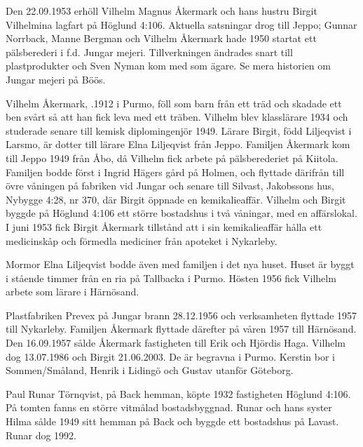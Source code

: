 Den 22.09.1953 erhöll Vilhelm Magnus Åkermark och hans hustru	Birgit Vilhelmina lagfart på Höglund 4:106. Aktuella satsningar drog till Jeppo; Gunnar Norrback, Manne Bergman och Vilhelm Åkermark hade 1950 startat ett pälsberederi i f.d. Jungar mejeri. Tillverkningen ändrades snart till plastprodukter och Sven Nyman kom med som ägare. Se mera historien om Jungar mejeri på Böös.

Vilhelm Åkermark, .1912 i Purmo, föll som barn från ett träd och skadade ett ben svårt så att han fick leva med ett träben. Vilhelm blev klasslärare 1934 och studerade senare till kemisk diplomingenjör 1949. 	Lärare Birgit, född Liljeqvist i Larsmo, är dotter till lärare Elna Liljeqvist från Jeppo. Familjen Åkermark kom till Jeppo 1949 från Åbo, då Vilhelm	fick arbete på pälsberederiet på Kiitola. Familjen bodde först i Ingrid Hägers gård på Holmen, och flyttade därifrån till övre våningen på fabriken vid Jungar och senare till Silvast, Jakobssons hus, Nybygge 4:28, nr 370, där Birgit öppnade en kemikalieaffär. Vilhelm och Birgit byggde på Höglund 4:106 ett större bostadshus i två våningar, med en 	affärslokal. I juni 1953 fick Birgit Åkermark tillstånd att i sin kemikalieaffär hålla ett medicinskåp och förmedla mediciner från apoteket i Nykarleby.
\begin{jhchildren}
  \item {}
  \item {}
  \item {}
\end{jhchildren}
Mormor Elna Liljeqvist bodde även med familjen i det nya huset. Huset är byggt i stående timmer från en ria på Tallbacka i Purmo. Hösten 1956 fick Vilhelm arbete som lärare i Härnösand.

Plastfabriken Prevex på Jungar brann 28.12.1956 och verksamheten flyttade 1957 till Nykarleby. Familjen Åkermark flyttade därefter på våren 1957 till Härnösand. Den 16.09.1957 sålde Åkermark fastigheten till Erik och Hjördis Haga. Vilhelm dog 13.07.1986 och Birgit 21.06.2003. De är begravna i Purmo. Kerstin bor i Sommen/Småland, Henrik i Lidingö och Gustav utanför Göteborg.


Paul Runar Törnqvist,  på Back hemman, köpte 1932 fastigheten Höglund 4:106. På tomten fanns en större vitmålad bostadsbyggnad. Runar och hans syster Hilma sålde 1949 sitt hemman på Back och byggde ett bostadshus på Lavast. Runar dog 1992.

